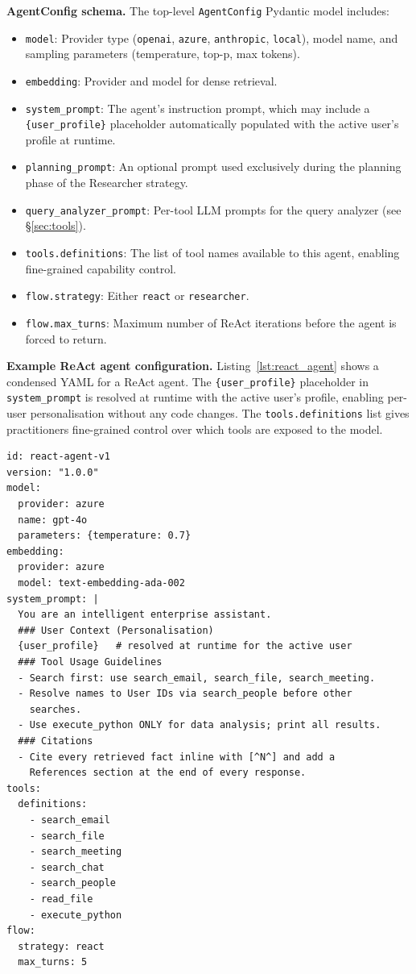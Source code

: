 \documentclass[10pt,twocolumn]{article}
\begin{document}
\textbf{AgentConfig schema.}
The top-level \texttt{AgentConfig} Pydantic model includes:

\begin{itemize}[leftmargin=*,itemsep=1pt]
  \item \texttt{model}: Provider type (\texttt{openai}, \texttt{azure},
    \texttt{anthropic}, \texttt{local}), model name, and sampling parameters
    (temperature, top-p, max tokens).
  \item \texttt{embedding}: Provider and model for dense retrieval.
  \item \texttt{system\_prompt}: The agent's instruction prompt, which may
    include a \texttt{\{user\_profile\}} placeholder automatically populated
    with the active user's profile at runtime.
  \item \texttt{planning\_prompt}: An optional prompt used exclusively during
    the planning phase of the Researcher strategy.
  \item \texttt{query\_analyzer\_prompt}: Per-tool LLM prompts for the query
    analyzer (see \S\ref{sec:tools}).
  \item \texttt{tools.definitions}: The list of tool names available to this
    agent, enabling fine-grained capability control.
  \item \texttt{flow.strategy}: Either \texttt{react} or \texttt{researcher}.
  \item \texttt{flow.max\_turns}: Maximum number of ReAct iterations before
    the agent is forced to return.
\end{itemize}

\textbf{Example ReAct agent configuration.}
Listing~\ref{lst:react_agent} shows a condensed YAML for a ReAct agent.
The \texttt{\{user\_profile\}} placeholder in \texttt{system\_prompt} is
resolved at runtime with the active user's profile, enabling per-user
personalisation without any code changes.
The \texttt{tools.definitions} list gives practitioners fine-grained
control over which tools are exposed to the model.

\begin{lstlisting}[caption={Condensed ReAct agent configuration (\texttt{react\_agent.yaml}).},label={lst:react_agent}]
id: react-agent-v1
version: "1.0.0"
model:
  provider: azure
  name: gpt-4o
  parameters: {temperature: 0.7}
embedding:
  provider: azure
  model: text-embedding-ada-002
system_prompt: |
  You are an intelligent enterprise assistant.
  ### User Context (Personalisation)
  {user_profile}   # resolved at runtime for the active user
  ### Tool Usage Guidelines
  - Search first: use search_email, search_file, search_meeting.
  - Resolve names to User IDs via search_people before other
    searches.
  - Use execute_python ONLY for data analysis; print all results.
  ### Citations
  - Cite every retrieved fact inline with [^N^] and add a
    References section at the end of every response.
tools:
  definitions:
    - search_email
    - search_file
    - search_meeting
    - search_chat
    - search_people
    - read_file
    - execute_python
flow:
  strategy: react
  max_turns: 5
\end{lstlisting}
\end{document}
